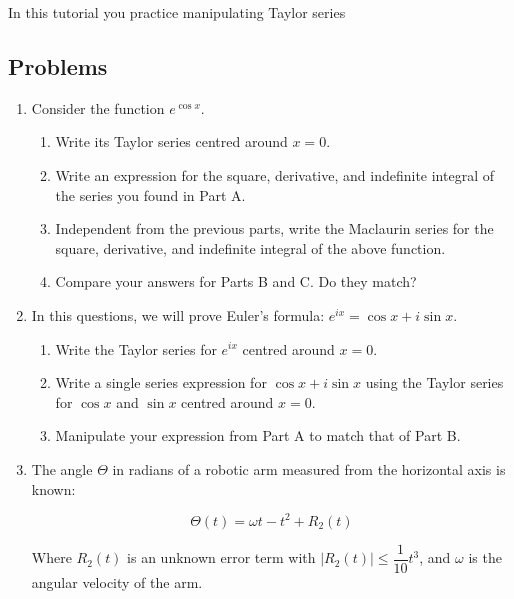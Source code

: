 		\begin{objectives}
			In this tutorial you practice manipulating Taylor series
		\end{objectives}

\subsection*{Problems}




\begin{enumerate}
    \item Consider the function $e^{\cos{x}}$. 
    
    \begin{enumerate}
        \item Write its Taylor series centred around $x=0$.
        \item Write an expression for the square, derivative, and indefinite integral of the series you found in Part A.
        \item Independent from the previous parts, write the Maclaurin series for the square, derivative, and indefinite integral of the above function.
        \item Compare your answers for Parts B and C. Do they match?
    \end{enumerate}

	\item In this questions, we will prove Euler's formula: $e^{ix} = \cos{x} + i\sin{x}$.
    \begin{enumerate}
        \item Write the Taylor series for $e^{ix}$ centred around $x=0$.
        \item Write a single series expression for $\cos{x} + i\sin{x}$ using the Taylor series for $\cos{x}$ and $\sin{x}$ centred around $x=0$.
        \item Manipulate your expression from Part A to match that of Part B.
    \end{enumerate}

    \item The angle $\Theta$ in radians of a robotic arm measured from the horizontal axis is known:

    \[\Theta(t) = \omega t - t^2 + R_2(t) \]

    Where $R_2(t)$ is an unknown error term with $|R_2(t)| \leq \dfrac{1}{10}t^3$, and $\omega$ is the angular velocity of the arm. 
    \begin{enumerate}


\end{enumerate}
\end{enumerate}
